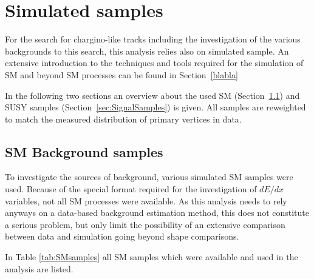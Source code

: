 \section{Simulated samples}
\label{sec:SimulatedSamples}

For the search for chargino-like tracks including the investigation of the various backgrounds to this search, this analysis relies also on simulated sample.
An extensive introduction to the techniques and tools required for the simulation of SM and beyond SM processes can be found in Section~\ref{blabla}

In the following two sections an overview about the used SM (Section~\ref{sec:SMSamples}) and SUSY samples (Section~\ref{sec:SignalSamples}) is given.
All samples are reweighted to match the measured distribution of primary vertices in data.


\subsection{SM Background samples}
\label{sec:SMSamples}
To investigate the sources of background, various simulated SM samples were used.
Because of the special format required for the investigation of $dE/dx$ variables, not all SM processes were available.
As this analysis needs to rely anyways on a data-based background estimation method, 
this does not constitute a serious problem, but only limit the possibility of an extensive comparison between data and simulation going beyond shape comparisons.

In Table \ref{tab:SMsamples} all SM samples which were available and used in the analysis are listed.

\newpage

